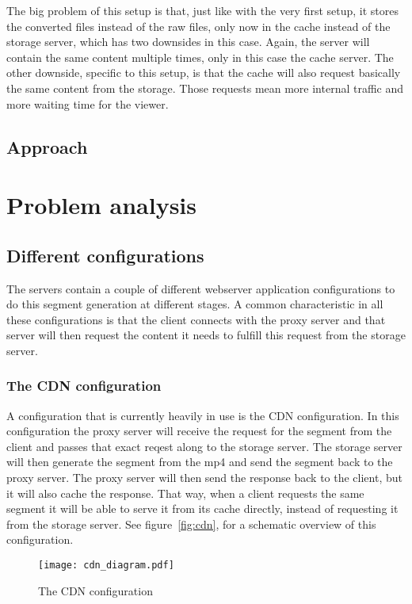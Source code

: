 \documentclass[twoside,openright]{uva-bachelor-thesis}
\begin{document}
The big problem of this setup is that, just like with the very first setup, it
stores the converted files instead of the raw files, only now in the cache
instead of the storage server, which has two downsides in this case. Again, the
server will contain the same content multiple times, only in this case the cache
server. The other downside, specific to this setup, is that the cache will also
request basically the same content from the storage. Those requests mean more
internal traffic and more waiting time for the viewer.

\section{Approach}






\chapter{Problem analysis}
\section{Different configurations}
The servers contain a couple of different webserver application configurations
to do this segment generation at different stages. A common characteristic in
all these configurations is that the client connects with the proxy server and
that server will then request the content it needs to fulfill this request from
the storage server.


\subsection{The CDN configuration}
A configuration that is currently heavily in use is the CDN configuration. In
this configuration the proxy server will receive the request for the segment
from the client and passes that exact reqest along to the storage server. The
storage server will then generate the segment from the mp4 and send the segment
back to the proxy server.  The proxy server will then send the response back to
the client, but it will also cache the response. That way, when a client
requests the same segment it will be able to serve it from its cache directly,
instead of requesting it from the storage server.
See figure~\vref{fig:cdn}, for a schematic overview of this configuration.
\begin{figure}
    \texttt{[image: cdn\_diagram.pdf]}
    \caption{The CDN configuration}\label{fig:cdn}
\end{figure}
\end{document}
